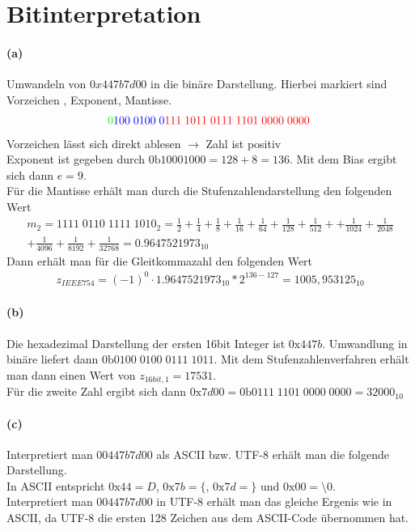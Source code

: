 \documentclass[a4paper]{article}
\begin{document}
\section{Bitinterpretation}

\paragraph{(a)}
Umwandeln von $0x447b7d00$ in die binäre Darstellung. Hierbei markiert sind \color{green} Vorzeichen \color{black},\color{blue} Exponent\color{black},\color{red} Mantisse.
\begin{align*}
    \color{green}0\color{blue}100\;0100\;0\color{red}111\;1011\;0111\;1101\;0000\;0000\;
\end{align*}
\color{black}
Vorzeichen lässt sich direkt ablesen $\rightarrow$ Zahl ist positiv\\
Exponent ist gegeben durch $0\text{b}10001000=128+8=136$. Mit dem Bias ergibt sich dann $e=9$.\\ Für die Mantisse erhält man durch die Stufenzahlendarstellung den folgenden Wert
\begin{align*}
    m_2=1111\;0110\;1111\;1010_2=\frac{1}{2}+\frac{1}{4}+\frac{1}{8}+\frac{1}{16}+\frac{1}{64}+\frac{1}{128}+\frac{1}{512}++\frac{1}{1024}+\frac{1}{2048}\\+\frac{1}{4096}+\frac{1}{8192}+\frac{1}{32768}=0.9647521973_{10}
\end{align*}
Dann erhält man für die Gleitkommazahl den folgenden Wert
\begin{align*}
    z_{IEEE754}=(-1)^0\cdot 1.9647521973_10*2^{136-127}=1005,953125_{10}
\end{align*}


\paragraph{(b)}
Die hexadezimal Darstellung der ersten 16bit Integer ist $0\text{x}447b$. Umwandlung in binäre liefert dann $0\text{b}0100\;0100\;0111\;1011$. Mit dem Stufenzahlenverfahren erhält man dann einen Wert von $z_{16bit,1}=17531$.\\
Für die zweite Zahl ergibt sich dann $0\text{x}7d00=0\text{b}0111\;1101\;0000\;0000=32000_{10}$


\paragraph{(c)}
Interpretiert man $0\text{0}447b7d00$ als ASCII bzw. UTF-8 erhält man die folgende Darstellung.\\
In ASCII entspricht $0\text{x}44=D$, $0\text{x}7b=\{$, $0\text{x}7d=\}$ und $0\text{x}00=\text{\textbackslash}0$.\\
Interpretiert man $0\text{0}447b7d00$ in UTF-8 erhält man das gleiche Ergenis wie in ASCII, da UTF-8 die ersten 128 Zeichen aus dem ASCII-Code übernommen hat.
\end{document}
